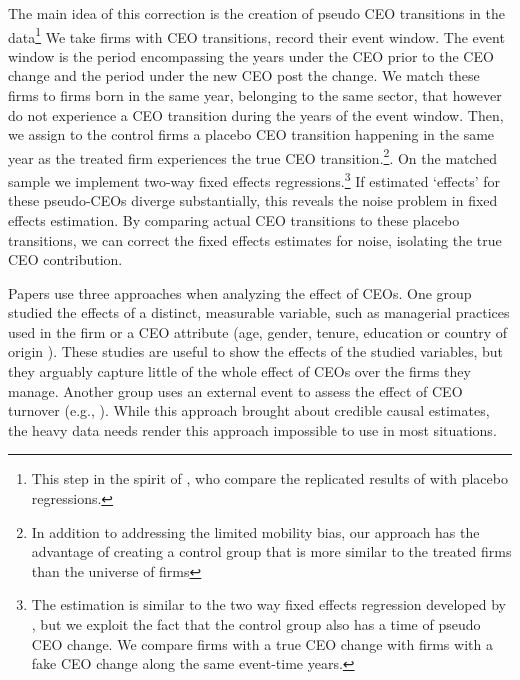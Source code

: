 \documentclass[11pt,a4paper]{article}
\begin{document}
The main idea of this correction is the creation of pseudo CEO transitions in the data\footnote{This step in the spirit of \cite{jarosiewicz2023revisiting}, who compare the replicated results of  \cite{Bertrand2003-io} with placebo regressions.} We take firms with CEO transitions, record their event window. The event window is the period encompassing the years under the CEO prior to the CEO change and the period under the new CEO post the change. We match these firms to firms born in the same year, belonging to the same sector, that however do not experience a CEO transition during the years of the event window. Then, we assign to the control firms a placebo CEO transition happening in the same year as the treated firm experiences the true CEO transition.\footnote{In addition to addressing the limited mobility bias, our approach has the advantage of creating a control group that is more similar to the treated firms than the universe of firms}. On the matched sample we implement two-way fixed effects regressions.\footnote{The estimation is similar to the two way fixed effects regression developed by \cite{Callaway2021JoLE}, but we exploit the fact that the control group also has a time of pseudo CEO change. We compare firms with a true CEO change with firms with a fake CEO change along the same event-time years.} If estimated `effects' for these pseudo-CEOs diverge substantially, this reveals the noise problem in fixed effects estimation. By comparing actual CEO transitions to these placebo transitions, we can correct the fixed effects estimates for noise, isolating the true CEO contribution.



Papers use three approaches when analyzing the effect of CEOs. One group studied the effects of a distinct, measurable variable, such as managerial practices used in the firm \citep{bloom2012organization} or a CEO attribute (age, gender, tenure, education or country of origin \citep{anderson2018pathways, henderson2006quickly, Koren2023expat}). These studies are useful to show the effects of the studied variables, but they arguably capture little of the whole effect of CEOs over the firms they manage. Another group uses an external event to assess the effect of CEO turnover (e.g., \citet{bennedsen2020ceos}). While this approach brought about credible causal estimates, the heavy data needs render this approach impossible to use in most situations. 
\end{document}
